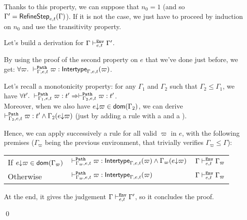 \documentclass[a4paper]{article}
\theoremstyle{definition}
\begin{document}
  Thanks to this property, we can suppose that $n_0 = 1$ (and so $\Gamma' = \textsf{RefineStep}_{e,t}(\Gamma)$).
  If it is not the case, we just have to proceed by induction on $n_0$ and use the transitivity property.

  Let's build a derivation for $\Gamma \vdash^{\texttt{Env}}_{e,t} \Gamma'$.

  By using the proof of the second property on $e$ that we've done just before, we get:
  $\forall \varpi.\ \vdash^{\texttt{Path}}_{\Gamma,e,t} \varpi: \textsf{Intertype}_{\Gamma,e,t} (\varpi)$.

  Let's recall a monotonicity property: for any $\Gamma_1$ and $\Gamma_2$ such that $\Gamma_2 \leq \Gamma_1$, we have
  $\forall t'.\ \vdash^{\texttt{Path}}_{\Gamma_1,e,t} \varpi:t' \Rightarrow \vdash^{\texttt{Path}}_{\Gamma_2,e,t} \varpi:t'$.\\  
  Moreover, when we also have $e{\downarrow}\varpi \in\textsf{dom}(\Gamma_2)$, we can derive $\vdash^{\texttt{Path}}_{\Gamma_2,e,t} \varpi:t'\land\Gamma_2(e{\downarrow}\varpi)$
  (just by adding a  rule with a  and a ).

  Hence, we can apply successively a  rule for all valid $\varpi$ in $e$,
  with the following premises ($\Gamma_\varpi$ being the previous environment, that trivially verifies $\Gamma_\varpi\leq\Gamma$):\\
  
  \begin{tabular}{lll}
    If $e{\downarrow}\varpi \in\textsf{dom}(\Gamma_\varpi)$&$\vdash^{\texttt{Path}}_{\Gamma_\varpi,e,t} \varpi: \textsf{Intertype}_{\Gamma,e,t} (\varpi)\land\Gamma_\varpi(e{\downarrow}\varpi)$&$\Gamma\vdash^{\texttt{Env}}_{e,t} {\Gamma_\varpi}$\\
    Otherwise&$\vdash^{\texttt{Path}}_{\Gamma_\varpi,e,t} \varpi: \textsf{Intertype}_{\Gamma,e,t} (\varpi)$&$\Gamma\vdash^{\texttt{Env}}_{e,t} {\Gamma_\varpi}$
  \end{tabular}

  At the end, it gives the judgement $\Gamma \vdash^{\texttt{Env}}_{e,t} \Gamma'$, so it concludes the proof.

  \qed
\end{document}
